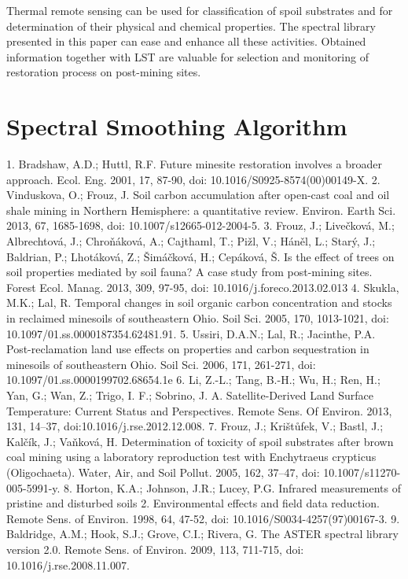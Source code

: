 Thermal remote sensing can be used for classification of spoil substrates and for determination of their physical and chemical properties. The spectral library presented in this paper can ease and enhance all these activities. Obtained information together with LST are valuable for selection and monitoring of restoration process on post-mining sites.

\section{Spectral Smoothing Algorithm}

1.	Bradshaw, A.D.; Huttl, R.F. Future minesite restoration involves a broader approach. Ecol. Eng. 2001, 17, 87-90, doi: 10.1016/S0925-8574(00)00149-X.
2.	Vinduskova, O.; Frouz, J. Soil carbon accumulation after open-cast coal and oil shale mining in Northern Hemisphere: a quantitative review. Environ. Earth Sci. 2013, 67, 1685-1698, doi: 10.1007/s12665-012-2004-5.
3.	Frouz, J.; Livečková, M.; Albrechtová, J.; Chroňáková, A.; Cajthaml, T.; Pižl, V.; Háněl, L.; Starý, J.; Baldrian, P.; Lhotáková, Z.; Šimáčková, H.; Cepáková, Š. Is the effect of trees on soil properties mediated by soil fauna? A case study from post-mining sites. Forest Ecol. Manag. 2013, 309, 97-95, doi: 10.1016/j.foreco.2013.02.013
4.	Skukla, M.K.; Lal, R. Temporal changes in soil organic carbon concentration and stocks in reclaimed minesoils of southeastern Ohio. Soil Sci. 2005, 170, 1013-1021, doi: 10.1097/01.ss.0000187354.62481.91.
5.	Ussiri, D.A.N.; Lal, R.; Jacinthe, P.A. Post-reclamation land use effects on properties and carbon sequestration in minesoils of southeastern Ohio. Soil Sci. 2006, 171, 261-271, doi: 10.1097/01.ss.0000199702.68654.1e
6.	Li, Z.-L.; Tang, B.-H.; Wu, H.; Ren, H.; Yan, G.; Wan, Z.; Trigo, I. F.; Sobrino, J. A. Satellite-Derived Land Surface Temperature: Current Status and Perspectives. Remote Sens. Of Environ. 2013, 131, 14–37, doi:10.1016/j.rse.2012.12.008.
7.	Frouz, J.; Krištůfek, V.; Bastl, J.; Kalčík, J.; Vaňková, H. Determination of toxicity of spoil substrates after brown coal mining using a laboratory reproduction test with Enchytraeus crypticus (Oligochaeta). Water, Air, and Soil Pollut. 2005, 162, 37–47, doi: 10.1007/s11270-005-5991-y.
8.	Horton, K.A.; Johnson, J.R.; Lucey, P.G. Infrared measurements of pristine and disturbed soils 2. Environmental effects and field data reduction. Remote Sens. of Environ. 1998, 64, 47-52, doi: 10.1016/S0034-4257(97)00167-3.
9.	Baldridge, A.M.; Hook, S.J.; Grove, C.I.; Rivera, G. The ASTER spectral library version 2.0. Remote Sens. of Environ. 2009, 113, 711-715, doi: 10.1016/j.rse.2008.11.007.
